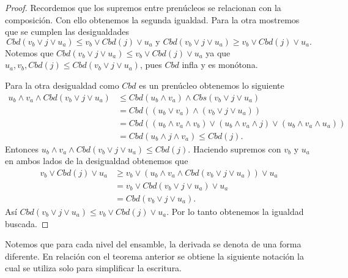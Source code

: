 \begin{proof}
    Recordemos que los supremos entre prenúcleos se relacionan con la composición. Con ello obtenemos la segunda igualdad. Para la otra mostremos que se cumplen las desigualdades 
    $$Cbd(v_b\vee j\vee u_a)\leq v_b\vee Cbd(j)\vee u_a\mbox{  y  }Cbd(v_b\vee j\vee u_a)\geq v_b\vee Cbd(j)\vee u_a.$$
    Notemos que $Cbd(v_b\vee j\vee u_a)\leq v_b\vee Cbd(j)\vee u_a$ ya que $u_a,v_b,Cbd(j)\leq Cbd(v_b\vee j\vee u_a)$, pues $Cbd$ infla y es monótona.
    
    \noindent
    Para la otra desigualdad como $Cbd$ es un prenúcleo obtenemos lo siguiente
    \begin{equation*}
        \begin{split}
            u_b\wedge v_a\wedge Cbd(v_b\vee j\vee u_a)& \leq Cbd(u_b \wedge v_a)\wedge Cbs(v_b\vee j\vee u_a)\\
            & =Cbd((u_b\vee v_a)\wedge (v_b\vee j\vee u_a))\\
            & =Cbd((u_b\wedge v_a\wedge v_b)\vee (u_b\wedge v_a\wedge j)\vee (u_b\wedge v_a\wedge u_a))\\
            & =Cbd(u_b\wedge j\wedge v_a)\leq Cbd(j).
        \end{split}
    \end{equation*}
    Entonces $u_b\wedge v_a\wedge Cbd(v_b\vee j\vee u_a)\leq Cbd(j)$. Haciendo supremos con $v_b$ y $u_a$ en ambos lados de la desigualdad obtenemos que
    \begin{equation*}
        \begin{split}
            v_b\vee Cbd(j)\vee u_a & \geq v_b\vee (u_b\wedge v_a\wedge Cbd(v_b\vee j\vee u_a))\vee u_a\\
            & =v_b\vee Cbd(v_b\vee j\vee u_a)\vee u_a\\
            & =Cbd(v_b\vee j\vee u_a).
        \end{split}
    \end{equation*}
    Así $Cbd(v_b\vee j\vee u_a)\leq v_b\vee Cbd(j)\vee u_a$. Por lo tanto obtenemos la igualdad buscada.
\end{proof}

Notemos que para cada nivel del ensamble, la derivada se denota de una forma diferente. En relación con el teorema anterior se obtiene la siguiente notación la cual se utiliza solo para simplificar la escritura. 


